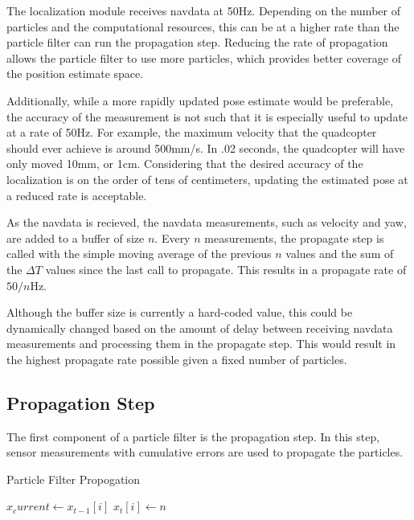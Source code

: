 The localization module receives navdata at 50Hz. Depending on the number of particles and the computational resources, this can be at a higher rate than the particle filter can run the propagation step. Reducing the rate of propagation allows the particle filter to use more particles, which provides better coverage of the position estimate space.

Additionally, while a more rapidly updated pose estimate would be preferable, the accuracy of the measurement is not such that it is especially useful to update at a rate of 50Hz. For example, the maximum velocity that the quadcopter should ever achieve is around 500mm/s. In .02 seconds, the quadcopter will have only moved 10mm, or 1cm. Considering that the desired accuracy of the localization is on the order of tens of centimeters, updating the estimated pose at a reduced rate is acceptable.

As the navdata is recieved, the navdata measurements, such as velocity and yaw, are added to a buffer of size $n$. Every $n$ measurements, the propagate step is called with the simple moving average of the previous $n$ values and the sum of the $\Delta T$ values since the last call to propagate. This results in a propagate rate of $50/n$Hz.

Although the buffer size is currently a hard-coded value, this could be dynamically changed based on the amount of delay between receiving navdata measurements and processing them in the propagate step. This would result in the highest propagate rate possible given a fixed number of particles.

\subsection{Propagation Step}

The first component of a particle filter is the propagation step. In this step, sensor measurements with cumulative errors are used to propagate the particles. 

	\begin{algorithm}
		\centering
		\caption{Particle Filter Propogation} 
		\begin{algorithmic}[1]
			    \State $x_current \gets x_{t-1}[i]$
			    \State $x_t[i] \gets n$
			\EndFor
			\EndFunction
		\end{algorithmic}
	\end{algorithm}

